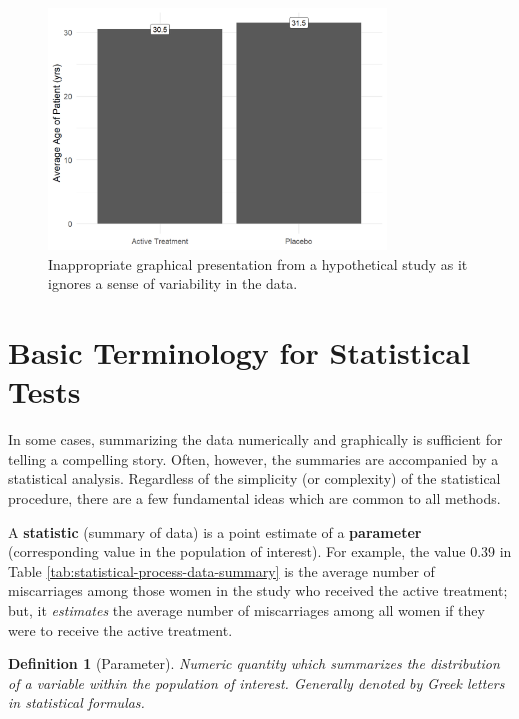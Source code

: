 \documentclass[
]{book}
\theoremstyle{plain}
\theoremstyle{mydefn}
\newtheorem{definition}{Definition}[chapter]
\theoremstyle{myexmpl}
\theoremstyle{remark}
\begin{document}
\begin{figure}

{\centering \includegraphics[width=0.8\textwidth]{./Images/statistical-process-poor-graphics-1} 

}

\caption{Inappropriate graphical presentation from a hypothetical study as it ignores a sense of variability in the data.}\label{fig:statistical-process-poor-graphics}
\end{figure}

\hypertarget{basic-terminology-for-statistical-tests}{%
\section{Basic Terminology for Statistical Tests}\label{basic-terminology-for-statistical-tests}}

In some cases, summarizing the data numerically and graphically is sufficient for telling a compelling story. Often, however, the summaries are accompanied by a statistical analysis. Regardless of the simplicity (or complexity) of the statistical procedure, there are a few fundamental ideas which are common to all methods.

A \textbf{statistic} (summary of data) is a point estimate of a \textbf{parameter} (corresponding value in the population of interest). For example, the value 0.39 in Table \ref{tab:statistical-process-data-summary} is the average number of miscarriages among those women in the study who received the active treatment; but, it \emph{estimates} the average number of miscarriages among all women if they were to receive the active treatment.

\begin{definition}[Parameter]
\protect\hypertarget{def:defn-parameter}{}{\label{def:defn-parameter} {} }Numeric quantity which summarizes the distribution of a variable within the \emph{population} of interest. Generally denoted by Greek letters in statistical formulas.
\end{definition}
\end{document}
